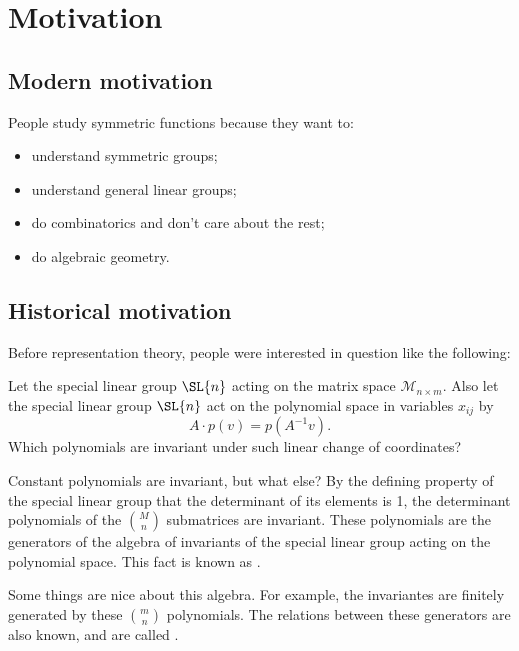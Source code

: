\chapter{Motivation}

\section{Modern motivation}

People study symmetric functions because they want to:
\begin{itemize}
    \item understand symmetric groups;
    \item understand general linear groups;
    \item do combinatorics and don't care about the rest;
    \item do algebraic geometry.
\end{itemize}

\section{Historical motivation}

Before representation theory, people were interested in question like the following:

\begin{question}
    Let the special linear group \(\SL{n}\) acting on the matrix space \(\mathcal{M}_{n \times m}\).
    Also let the special linear group \(\SL{n}\) act on the polynomial space in variables \(x_{ij}\) by
    \begin{equation*}
        A \cdot p(v) = p(A^{-1}v).
    \end{equation*}
    Which polynomials are invariant under such linear change of coordinates?
\end{question}

Constant polynomials are invariant, but what else?
By the defining property of the special linear group that the determinant of its elements is 1,
the determinant polynomials of the \(\binom{M}{n}\) submatrices are invariant.
These polynomials are the generators of the algebra of invariants of the special linear group acting on the polynomial space.
This fact is known as .

Some things are nice about this algebra.
For example, the invariantes are finitely generated by these \(\binom{m}{n}\) polynomials.
The relations between these generators are also known,
and are called .

